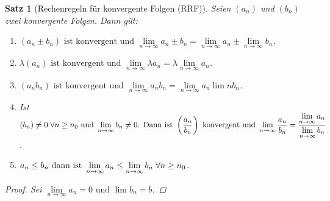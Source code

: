 \documentclass[a4paper,titlepage,oneside]{article}
\def\N{\ensuremath{\mathbb{N}} }
\renewcommand{\epsilon}{\ensuremath{\varepsilon} }
\def\sp{\hspace{0,1cm}}
\def\spcolon{\sp:\sp}
\renewcommand{\liminf}[2][n]{\ensuremath{\lim\limits_{#1 \rightarrow \infty}{#2}}}
\newcommand{\abs}[1]{\ensuremath{\left|\:#1\:\right|}}
\theoremstyle{thmstyle}
\newtheorem{satz}{Satz}[section]
\theoremstyle{subthmstyle}
\begin{document}
\newpage
\begin{satz}[Rechenregeln für konvergente Folgen (RRF)]
Seien \((a_n)\) und \((b_n)\) zwei konvergente Folgen. Dann gilt:
\begin{enumerate}
\item \((a_n \pm b_n)\text{ ist konvergent und }\liminf{a_n  \pm  b_n} = \liminf{a_n}  \pm \liminf{b_n}\).
\item \(\lambda (a_n)\text{ ist konvergent und }\liminf{\lambda a_n} = \lambda \liminf{a_n}\).
\item \((a_n b_n)\text{ ist konvergent und }\liminf{a_n b_n} = \liminf{a_n} \lim{n}{b_n}\).
\item Ist $ \displaystyle (b_n) \ne 0 \sp \forall n \ge n_0\text{ und }\liminf{b_n} \ne 0\text{. Dann ist } \left(\frac{a_n}{b_n}\right) \text{ konvergent und }\liminf{\frac{a_n}{b_n}} = \frac{\liminf{a_n}}{\liminf{b_n}}$.
\item \(a_n \le b_n \text{ dann ist }\liminf{a_n} \le \liminf{b_n} \sp \forall n \ge n_0\).
\end{enumerate}
\begin{proof}
Sei \(\liminf{a_n} = 0\text{ und } \lim{b_n} = b\).
\end{proof}
\end{satz}
\end{document}
